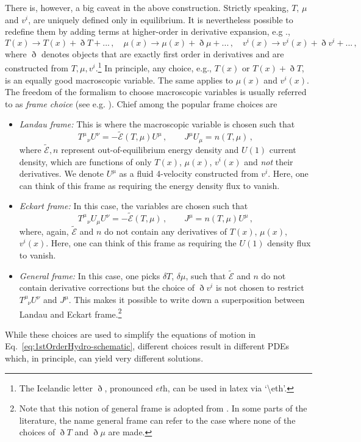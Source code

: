 \documentclass[superscriptaddress,prd,nofootinbib,preprintnumbers,longbibliography,11pt,eqsecnum]{revtex4-1}
\def\CE{\mathcal{E}}
\begin{document}
There is, however, a big caveat in the above construction. Strictly speaking, $T$, $\mu$ and $v^{i}$, are uniquely defined only in equilibrium. It is nevertheless possible to redefine them by adding terms at higher-order in derivative expansion, e.g .,
\begin{equation}
  T(x) \to T(x) + \eth T+... 
  \,,
  \quad
  \mu(x) \to \mu(x) + \eth \mu+...
  \,,
  \quad
  v^{i}(x) \to v^{i}(x) + \eth v^{i}+...
  \,,
\end{equation}
where $\eth$ denotes objects that are exactly first order in derivatives and are constructed from $T, \mu ,v^i$.\footnote{The Icelandic letter $\eth$, pronounced $\textit{eth}$, can be used in latex via `\textbackslash eth'.} In principle, any choice, e.g., $T(x)$ or $T(x) + \eth T$, is an equally good macroscopic variable. The same applies to $\mu(x)$ and $v^i(x)$. The freedom of the formalism to choose macroscopic variables is usually referred to as \textit{frame choice} (see e.g. \cite{LLfluid,Kovtun:2012rj}). Chief among the popular frame choices are
\begin{itemize}
  \item \textit{Landau frame:} This is where the macroscopic variable is chosen such that 
\begin{equation}\label{eq:landau_frame}
T^{\mu}_{\;\;\,\nu} U^\nu = - \tilde{\CE}(T,\mu)U^\mu \, ,\qquad J^\mu U_\mu = n(T,\mu)
	\,,
\end{equation}
where $\tilde{\CE},n$ represent out-of-equilibrium energy density and $U(1)$ current density, which are functions of only $T(x)$, $\mu(x)$, $v^i(x)$ and \textit{not} their derivatives. We denote $U^\mu$ as a fluid 4-velocity constructed from $v^i$. Here, one can think of this frame as requiring the energy density flux to vanish.
\item \textit{Eckart frame:} In this case, the variables are chosen such that 
\begin{equation}\label{eq:eckart_frame}
  T^{\mu}_{\;\;\,\nu}U_\mu U^\nu = -\tilde{\CE}(T,\mu) \, ,\qquad J^\mu = n(T,\mu) U^\mu
  \,,
\end{equation}
where, again, $\tilde{\CE}$ and $n$ do not contain any derivatives of $T(x)$, $\mu(x)$, $v^i(x)$. Here, one can think of this frame as requiring the $U(1)$ density flux to vanish.
\item \textit{General frame:} In this case, one picks $\delta T$, $\delta \mu$, such that $\tilde{\CE}$ and $n$ do not contain derivative corrections but the choice of $\eth v^i$ is not chosen to restrict $T^\mu_{\;\; \nu} U^\nu$ and $J^\mu$. This makes it possible to write down a superposition between Landau and Eckart frame.\footnote{Note that this notion of general frame is adopted from \cite{Hiscock:1985zz}. In some parts of the literature, the name general frame can refer to the case where none of the choices of $\eth T$ and $\eth \mu$ are made.}
\end{itemize}
While these choices  are used to simplify the equations of motion in Eq.~\eqref{eq:1stOrderHydro-schematic}, different choices result in different PDEs which, in principle, can yield very different solutions. 
\end{document}
